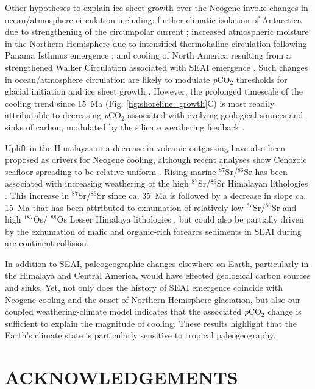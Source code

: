 \documentclass[11pt,letterpaper]{article}
\newcommand{\SrSr}{$^{87}$Sr/$^{86}$Sr\xspace}
\newcommand{\OsOs}{$^{187}$Os/$^{188}$Os\xspace}
\newcommand{\pCOtwo}{\textit{p}CO$_{2}$\xspace}
\begin{document}
Other hypotheses to explain ice sheet growth over the Neogene invoke changes in ocean/atmosphere circulation including: further climatic isolation of Antarctica due to strengthening of the circumpolar current \cite{Shevenell2004a}; increased atmospheric moisture in the Northern Hemisphere due to intensified thermohaline circulation following Panama Isthmus emergence \cite{Haug1998a}; and cooling of North America resulting from a strengthened Walker Circulation associated with SEAI emergence \cite{Molnar2015a}. Such changes in ocean/atmosphere circulation are likely to modulate \pCOtwo thresholds for glacial initiation and ice sheet growth \cite{DeConto2008a}. However, the prolonged timescale of the cooling trend since 15~Ma (Fig. \ref{fig:shoreline_growth}C) is most readily attributable to decreasing \pCOtwo associated with evolving geological sources and sinks of carbon, modulated by the silicate weathering feedback \cite{Walker1981a, Raymo1991a, Berner1997a, Kump1997a, Berner2001a}.

Uplift in the Himalayas \cite{Raymo1988a} or a decrease in volcanic outgassing \cite{Berner1983a} have also been proposed as drivers for Neogene cooling, although recent analyses show Cenozoic seafloor spreading to be relative uniform \cite{Rowan2016a}. Rising marine \SrSr has been associated with increasing weathering of the high \SrSr Himalayan lithologies \cite{Raymo1992a}. This increase in \SrSr since ca. 35~Ma is followed by a decrease in slope ca. 15~Ma that has been attributed to exhumation of relatively low \SrSr and high \OsOs Lesser Himalaya lithologies \cite{Myrow2015a, Colleps2018a}, but could also be partially driven by the exhumation of mafic and organic-rich forearcs sediments in SEAI during arc-continent collision.

In addition to SEAI, paleogeographic changes elsewhere on Earth, particularly in the Himalaya and Central America, would have effected geological carbon sources and sinks. Yet, not only does the history of SEAI emergence coincide with Neogene cooling and the onset of Northern Hemisphere glaciation, but also our coupled weathering-climate model indicates that the associated \pCOtwo change is sufficient to explain the magnitude of cooling. These results highlight that the Earth's climate state is particularly sensitive to tropical paleogeography.

\section*{ACKNOWLEDGEMENTS \label{sec:ACKNOWLEDGEMENTS}}
\end{document}
